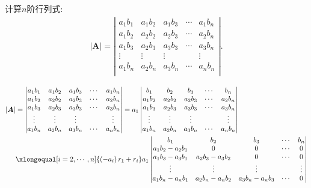 \documentclass[lang=cn,newtx,10pt,scheme=chinese]{elegantbook}
\begin{document}
\begin{exercise}
计算$n$阶行列式:
\begin{gather}
|\boldsymbol{A}|=\left| \begin{matrix}
a_1b_1&		a_1b_2&		a_1b_3&		\cdots&		a_1b_n\\
a_1b_2&		a_2b_2&		a_2b_3&		\cdots&		a_2b_n\\
a_1b_3&		a_2b_3&		a_3b_3&		\cdots&		a_3b_n\\
\vdots&		\vdots&		\vdots&		&		\vdots\\
a_1b_n&		a_2b_n&		a_3b_n&		\cdots&		a_nb_n\\
\end{matrix} \right|.
\nonumber
\end{gather}
\begin{solution}
\begin{equation}
\begin{split}
|\boldsymbol{A}|&=\left| \begin{matrix}
a_1b_1&		a_1b_2&		a_1b_3&		\cdots&		a_1b_n\\
a_1b_2&		a_2b_2&		a_2b_3&		\cdots&		a_2b_n\\
a_1b_3&		a_2b_3&		a_3b_3&		\cdots&		a_3b_n\\
\vdots&		\vdots&		\vdots&		&		\vdots\\
a_1b_n&		a_2b_n&		a_3b_n&		\cdots&		a_nb_n\\
\end{matrix} \right|=a_1\left| \begin{matrix}
b_1&		b_2&		b_3&		\cdots&		b_n\\
a_1b_2&		a_2b_2&		a_2b_3&		\cdots&		a_2b_n\\
a_1b_3&		a_2b_3&		a_3b_3&		\cdots&		a_3b_n\\
\vdots&		\vdots&		\vdots&		&		\vdots\\
a_1b_n&		a_2b_n&		a_3b_n&		\cdots&		a_nb_n\\
\end{matrix} \right|
\\
&\xlongequal[i=2,\cdots ,n]{\left( -a_i \right) r_1+r_i}a_1\left| \begin{matrix}
b_1&		b_2&		b_3&		\cdots&		b_n\\
a_1b_2-a_2b_1&		0&		0&		\cdots&		0\\
a_1b_3-a_3b_1&		a_2b_3-a_3b_2&		0&		\cdots&		0\\
\vdots&		\vdots&		\vdots&		&		\vdots\\
a_1b_n-a_nb_1&		a_2b_n-a_nb_2&		a_3b_n-a_nb_3&		\cdots&		0\\
\end{matrix} \right|

\end{split}
\end{equation}
\end{solution}
\end{exercise}
\end{document}
